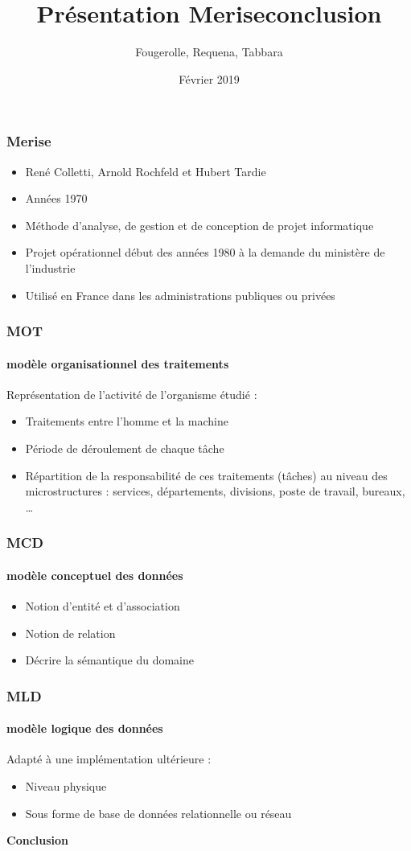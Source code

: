 \documentclass{beamer}
\title{Présentation Merise}
\author{Fougerolle, Requena, Tabbara}
\date{Février 2019}
\begin{document}
\maketitle
\begin{frame}
\frametitle{Merise}
\begin{itemize}
\item René Colletti, Arnold Rochfeld et Hubert Tardie
\item Années 1970
\item Méthode d'analyse, de gestion et de conception de projet informatique
\item Projet opérationnel début des années 1980 à la demande du ministère de l'industrie
\item Utilisé en France dans les administrations publiques ou privées
\end{itemize}
\end{frame}
\begin{frame}
\frametitle{MOT}
\framesubtitle{modèle organisationnel des traitements} 
Représentation de l'activité de l'organisme étudié :
\begin{itemize}
\item Traitements entre l'homme et la machine \item Période de déroulement de chaque tâche
\item Répartition de la responsabilité de ces traitements (tâches) au niveau des microstructures : services, départements, divisions, poste de travail, bureaux, …
\end{itemize}
\end{frame}
\begin{frame}
\frametitle{MCD}
\framesubtitle{modèle conceptuel des données}
\begin{itemize}
\item Notion d'entité et d'association
\item Notion de relation
\item Décrire la sémantique du domaine
\end{itemize}
\end{frame}
\begin{frame}
\frametitle{MLD}
\framesubtitle{modèle logique des données}
Adapté à une implémentation ultérieure :
\begin{itemize}
\item Niveau physique
\item Sous forme de base de données relationnelle ou réseau
\end{itemize}
\end{frame}
\begin{frame}
\title{conclusion}
\begin{centre}
\textbf{Conclusion}    
\end{centre}

\end{frame}
\end{document}
